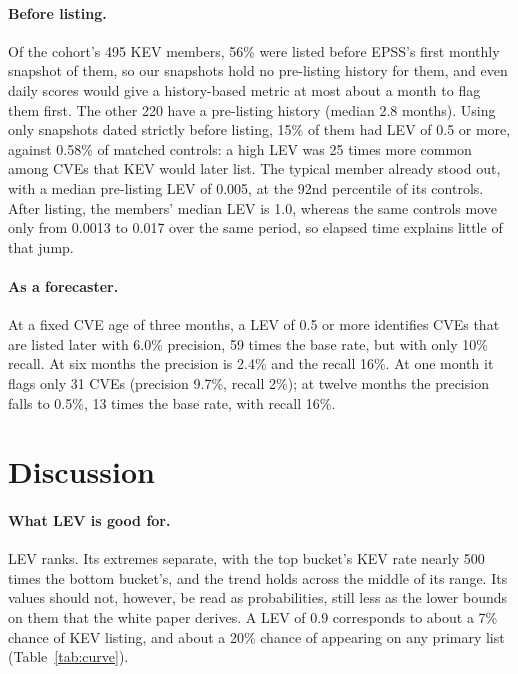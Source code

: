 \paragraph{Before listing.} Of the cohort's 495 KEV members, 56\% were listed
before EPSS's first monthly snapshot of them, so our snapshots hold no
pre-listing history for them, and even daily scores would give a history-based
metric at most about a month to flag them first. The other 220 have a pre-listing history (median
2.8 months). Using only snapshots dated strictly before listing, 15\% of them
had LEV of 0.5 or more, against 0.58\% of matched controls: a high LEV was 25
times more common among CVEs that KEV would later list. The typical member
already stood out, with a median pre-listing LEV of 0.005, at the 92nd
percentile of its controls. After listing, the members' median LEV is 1.0,
whereas the same controls move only from 0.0013 to 0.017 over the same period,
so elapsed time explains little of that jump.

\paragraph{As a forecaster.} At a fixed CVE age of three months, a LEV of 0.5
or more identifies CVEs that are listed later with 6.0\% precision, 59 times
the base rate, but with only 10\% recall. At six months the precision is 2.4\%
and the recall 16\%. At one month it flags only 31 CVEs (precision 9.7\%,
recall 2\%); at twelve months the precision falls to 0.5\%, 13 times the base
rate, with recall 16\%.


\section{Discussion}\label{sec:discussion}

\paragraph{What LEV is good for.} LEV ranks. Its extremes separate, with the
top bucket's KEV rate nearly 500 times the bottom bucket's, and the trend holds
across the middle of its range. Its values should not, however, be read as
probabilities, still less as the lower bounds on them that the white paper
derives. A LEV of 0.9 corresponds to about a 7\% chance of KEV listing,
and about a 20\% chance of appearing on any primary list
(Table~\ref{tab:curve}).

